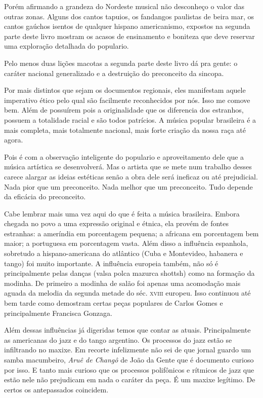 Porém afirmando a grandeza do Nordeste musical não desconheço o valor
das outras zonas. Alguns dos cantos tapuios, os fandangos paulistas de
beira mar, os cantos gaúchos isentos de qualquer hispano americanismo,
expostos na segunda parte deste livro mostram os acasos de ensinamento e
boniteza que deve reservar uma exploração detalhada do populario.

Pelo menos duas lições macotas a segunda parte deste livro dá pra gente:
o caráter nacional generalizado e a destruição do preconceito da
sincopa.

Por mais distintos que sejam os documentos regionais, eles manifestam
aquele imperativo ético pelo qual são facilmente reconhecidos por nós.
Isso me comove bem. Além de possuírem pois a originalidade que os
diferencia dos estranhos, possuem a totalidade racial e são todos
patrícios. A música popular brasileira é a mais completa, mais
totalmente nacional, mais forte criação da nossa raça até agora.

Pois é com a observação inteligente do populario e aproveitamento dele
que a música artística se desenvolverá. Mas o artista que se mete num
trabalho desses carece alargar as ideias estéticas senão a obra dele
será ineficaz ou até prejudicial. Nada pior que um preconceito. Nada
melhor que um preconceito. Tudo depende da eficácia do preconceito.

Cabe lembrar mais uma vez aqui do que é feita a música brasileira.
Embora chegada no povo a uma expressão original e étnica, ela provém de
fontes estranhas: a ameríndia em porcentagem pequena; a africana em
porcentagem bem maior; a portuguesa em porcentagem vasta. Além disso a
influência espanhola, sobretudo a hispano-americana do atlântico (Cuba e
Montevideo, habanera e tango) foi muito importante. A influência
europeia também, não só é principalmente pelas danças (valsa polca
mazurca shottsh) como na formação da modinha. De primeiro a modinha de
salão foi apenas uma acomodação mais aguada da melodia da segunda metade
do séc. \textsc{xviii} europeu. Isso continuou até bem tarde como demostram
certas peças populares de Carlos Gomes e principalmente Francisca
Gonzaga.

Além dessas influências já digeridas temos que contar as atuais.
Principalmente as americanas do jazz e do tango argentino. Os processos
do jazz estão se infiltrando no maxixe. Em recorte infelizmente não sei
de que jornal guardo um samba macumbeiro, \emph{Aruê de Changô} de João
da Gente que é documento curioso por isso. E tanto mais curioso que os
processos polifônicos e rítmicos de jazz que estão nele não prejudicam
em nada o caráter da peça. É um maxixe legítimo. De certos os
antepassados coincidem.

